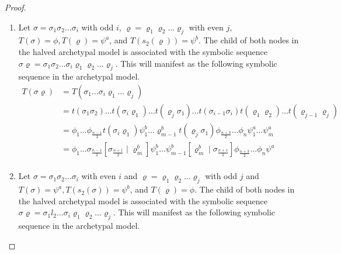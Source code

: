 \begin{proof} \phantom{x}
	\begin{enumerate}
		\item Let $\sigma = \sigma_1\sigma_2 \dots \sigma_i$ with odd $i$, $\varrho = \varrho_1\varrho_2 \dots \varrho_j$ with even $j$, $T(\sigma) = \phi, T(\varrho) = \psi^a$, and $T(s_2(\varrho)) = \psi^b$.
		      The child of both nodes in the halved archetypal model is associated with the symbolic sequence $\sigma\varrho = \sigma_1\sigma_2 \dots \sigma_i \varrho_1\varrho_2 \dots \varrho_j$.
		      This will manifest as the following symbolic sequence in the archetypal model.
		      \begin{align*}
			      T(\sigma\varrho) & = T(\sigma_1 \dots \sigma_i \varrho_1 \dots \varrho_j)                                                                                       \\
			                       & =
			      t(\sigma_1\sigma_2) \dots t(\sigma_i \varrho_1) \dots t(\varrho_j \sigma_1) \dots t(\sigma_{i-1}\sigma_i) t(\varrho_1\varrho_2) \dots t(\varrho_{j-1}\varrho_j) \\
			                       & = \phi_1 \dots \phi_{\frac{n-1}{2}} t(\sigma_i \varrho_1)
			      \psi^b_1 \dots \varrho^b_{m-1} t(\varrho_j \sigma_1)
			      \phi_{\frac{n+3}{2}} \dots \phi_n
			      \psi^a_1 \dots \psi^a_m                                                                                                                                         \\
			                       & =
			      \phi_1 \dots \sigma_{\frac{n-1}{2}} \left[\sigma_{\frac{n+1}{2}} \mid \varrho^b_m\right]
			      \psi^b_1 \dots \psi^b_{m-1} \left[\varrho^b_m \mid \sigma_{\frac{n+1}{2}}\right]
			      \phi_{\frac{n+3}{2}} \dots \phi_n
			      \psi^a                                                                                                                                                          \\
		      \end{align*}
		\item Let $\sigma = \sigma_1\sigma_2 \dots \sigma_i$ with even $i$ and $\varrho = \varrho_1\varrho_2 \dots \varrho_j$ with odd $j$ and $T(\sigma) = \psi^a, T(s_2(\sigma)) = \psi^b$, and $T(\varrho) = \phi$.
		      The child of both nodes in the halved archetypal model is associated with the symbolic sequence $\sigma\varrho = \sigma_1l_2 \dots \sigma_i \varrho_1\varrho_2 \dots \varrho_j$.
		      This will manifest as the following symbolic sequence in the archetypal model.

\end{enumerate}
\end{proof}
